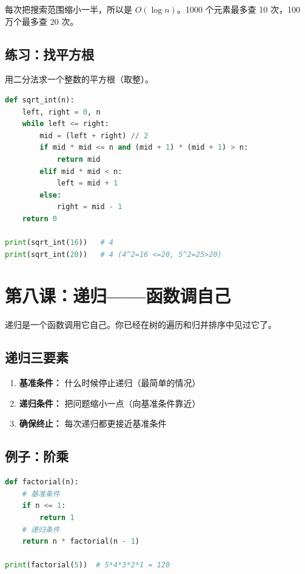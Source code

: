 \documentclass[a4paper,12pt]{ctexart}
\begin{document}
每次把搜索范围缩小一半，所以是 $O(\log n)$。1000 个元素最多查 10 次，100 万个最多查 20 次。

\subsection*{练习：找平方根}

用二分法求一个整数的平方根（取整）。

\begin{lstlisting}[language=Python]
def sqrt_int(n):
    left, right = 0, n
    while left <= right:
        mid = (left + right) // 2
        if mid * mid <= n and (mid + 1) * (mid + 1) > n:
            return mid
        elif mid * mid < n:
            left = mid + 1
        else:
            right = mid - 1
    return 0

print(sqrt_int(16))   # 4
print(sqrt_int(20))   # 4 (4^2=16 <=20, 5^2=25>20)
\end{lstlisting}

\section*{第八课：递归——函数调自己}

递归是一个函数调用它自己。你已经在树的遍历和归并排序中见过它了。

\subsection*{递归三要素}

\begin{enumerate}
  \item \textbf{基准条件：} 什么时候停止递归（最简单的情况）
  \item \textbf{递归条件：} 把问题缩小一点（向基准条件靠近）
  \item \textbf{确保终止：} 每次递归都更接近基准条件
\end{enumerate}

\subsection*{例子：阶乘}

\begin{lstlisting}[language=Python]
def factorial(n):
    # 基准条件
    if n <= 1:
        return 1
    # 递归条件
    return n * factorial(n - 1)

print(factorial(5))  # 5*4*3*2*1 = 120
\end{lstlisting}
\end{document}
